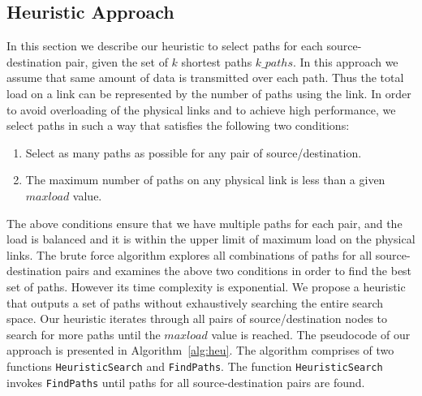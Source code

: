 \subsection{Heuristic Approach}
\label{sec:heuristic}

In this section we describe our heuristic to select paths for each source-destination pair, given the set of $k$ shortest paths $k\_paths$. In this approach we assume that same amount of data is transmitted over each path. Thus the total load on a link can be represented by the number of paths using the link. In order to avoid overloading of the physical links and to achieve high performance, we select paths in such a way that satisfies the following two conditions:
\begin{enumerate}
\item Select as many paths as possible for any pair of source/destination. 
\item The maximum number of paths on any physical link is less than a given $maxload$ value.
\end{enumerate}
The above conditions ensure that we have multiple paths for each pair, and the load is balanced and it is within the upper limit of maximum load on the physical links. The brute force algorithm explores all combinations of paths for all source-destination pairs and examines the above two conditions in order to find the best set of paths. However its time complexity is exponential. We propose a heuristic that outputs a set of paths without exhaustively searching the entire search space. Our heuristic iterates through all pairs of source/destination nodes to search for more paths until the $maxload$ value is reached. The pseudocode of our approach is presented in Algorithm~\ref{alg:heu}. The algorithm comprises of two functions \texttt{HeuristicSearch} and \texttt{FindPaths}. The function \texttt{HeuristicSearch} invokes \texttt{FindPaths} until paths for all source-destination pairs are found. 
 
